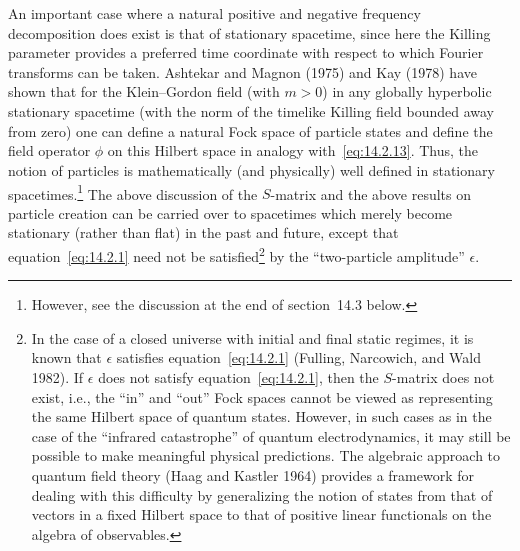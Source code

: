 An important case where a natural positive and negative frequency decomposition
does exist is that of stationary spacetime, since here the Killing parameter provides
a preferred time coordinate with respect to which Fourier transforms can be taken.
Ashtekar and Magnon (1975) and Kay (1978) have shown that for the Klein--Gordon
field (with \(m>0\)) in any globally hyperbolic stationary spacetime (with the norm
of the timelike Killing field bounded away from zero) one can define a natural Fock
space of particle states and define the field operator \(\widehat\phi\) on this Hilbert
space in analogy with~\eqref{eq:14.2.13}. Thus, the notion of particles is
mathematically (and physically) well defined in stationary spacetimes.\footnote{However,
see the discussion at the end of section~14.3 below.} The above discussion of the
\(S\)-matrix and the above results on particle creation can be carried over to
spacetimes which merely become stationary (rather than flat) in the past and future,
except that equation~\eqref{eq:14.2.1} need not be satisfied\footnote{In the case of
a closed universe with initial and final static regimes, it is known that \(\epsilon\)
satisfies equation~\eqref{eq:14.2.1} (Fulling, Narcowich, and Wald 1982). If
\(\epsilon\) does not satisfy equation~\eqref{eq:14.2.1}, then the \(S\)-matrix does
not exist, i.e., the ``in'' and ``out'' Fock spaces cannot be viewed as representing the
same Hilbert space of quantum states. However, in such cases as in the case of the
``infrared catastrophe'' of quantum electrodynamics, it may still be possible to make
meaningful physical predictions. The algebraic approach to quantum field theory
(Haag and Kastler 1964) provides a framework for dealing with this difficulty by
generalizing the notion of states from that of vectors in a fixed Hilbert space to that
of positive linear functionals on the algebra of observables.} by the ``two-particle
amplitude'' \(\epsilon\).

